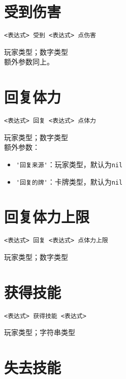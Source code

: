 \section{受到伤害}

\begin{verbatim}
<表达式> 受到 <表达式> 点伤害
\end{verbatim}

玩家类型；数字类型 \\

额外参数同上。

\section{回复体力}

\begin{verbatim}
<表达式> 回复 <表达式> 点体力
\end{verbatim}

玩家类型；数字类型 \\

额外参数：

\begin{itemize}
  \item \verb|'回复来源'|：玩家类型，默认为\verb|nil|
  \item \verb|'回复的牌'|：卡牌类型，默认为\verb|nil|
\end{itemize}

\section{回复体力上限}

\begin{verbatim}
<表达式> 回复 <表达式> 点体力上限
\end{verbatim}

玩家类型；数字类型

\section{获得技能}

\begin{verbatim}
<表达式> 获得技能 <表达式>
\end{verbatim}

玩家类型；字符串类型

\section{失去技能}

